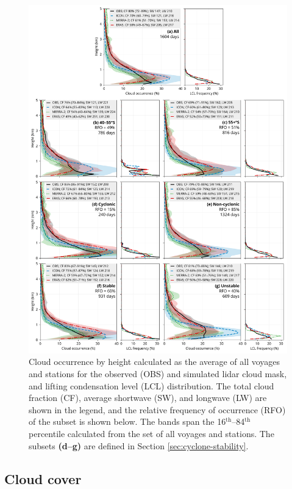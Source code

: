\documentclass[12pt,a4paper]{article}
\begin{document}
\begin{figure}[p!]
\centering
\includegraphics[width=\textwidth]{img/cl_agg.pdf}
\caption{
Cloud occurrence by height calculated as the average of all voyages and
stations for the observed (OBS) and simulated lidar cloud mask, and lifting
condensation level (LCL) distribution. The total cloud fraction (CF), average
shortwave (SW), and longwave (LW) are shown in the legend, and the relative
frequency of occurrence (RFO) of the subset is shown below.  The bands span the
16$^\mathrm{th}$--84$^\mathrm{th}$ percentile calculated from the set of all
voyages and stations. The subsets \textbf{(d--g)} are defined in Section
\ref{sec:cyclone-stability}.
}
\label{fig:cloud-occurrence}
\end{figure}

\subsection{Cloud cover}
\label{sec:cloud-cover}
\end{document}
